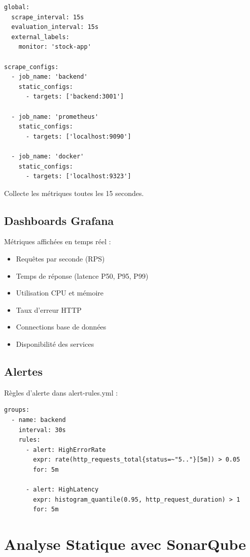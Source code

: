 \documentclass[12pt,a4paper]{report}
\begin{document}
\begin{verbatim}
global:
  scrape_interval: 15s
  evaluation_interval: 15s
  external_labels:
    monitor: 'stock-app'

scrape_configs:
  - job_name: 'backend'
    static_configs:
      - targets: ['backend:3001']
  
  - job_name: 'prometheus'
    static_configs:
      - targets: ['localhost:9090']
      
  - job_name: 'docker'
    static_configs:
      - targets: ['localhost:9323']
\end{verbatim}

Collecte les métriques toutes les 15 secondes.

\subsection{Dashboards Grafana}

Métriques affichées en temps réel :

\begin{itemize}
    \item Requêtes par seconde (RPS)
    \item Temps de réponse (latence P50, P95, P99)
    \item Utilisation CPU et mémoire
    \item Taux d'erreur HTTP
    \item Connections base de données
    \item Disponibilité des services
\end{itemize}

\subsection{Alertes}

Règles d'alerte dans alert-rules.yml :

\begin{verbatim}
groups:
  - name: backend
    interval: 30s
    rules:
      - alert: HighErrorRate
        expr: rate(http_requests_total{status=~"5.."}[5m]) > 0.05
        for: 5m
        
      - alert: HighLatency
        expr: histogram_quantile(0.95, http_request_duration) > 1
        for: 5m
\end{verbatim}

\section{Analyse Statique avec SonarQube}
\end{document}
